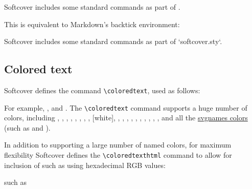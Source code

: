 \begin{code}
Softcover includes some standard commands as part of .
\end{code}

\noindent This is equivalent to Markdown's backtick environment:

\begin{code}
Softcover includes some standard commands as part of `softcover.sty`.
\end{code}

\subsection{Colored text} %
\label{sec:colored_text}

Softcover defines the command \verb+\coloredtext+, used as follows:

\begin{code}
\end{code}

\noindent For example, , and . The \verb+\coloredtext+ command supports a huge number of colors, including
,
,
,
,
,
,
,
,
 [white],
,
,
,
,
,
,
,
,
,
, and all the \href{http://www.latextemplates.com/svgnames-colors}{svgnames colors} (such as  and ).

In addition to supporting a large number of named colors, for maximum flexibility Softcover defines the \verb+\coloredtexthtml+ command to allow for inclusion of  such as  using hexadecimal RGB values:

\begin{code}
 such as
\end{code}

